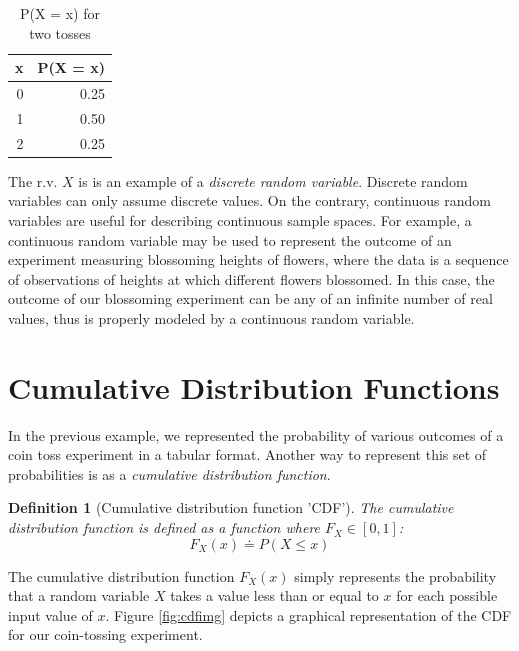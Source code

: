 \documentclass[
  12pt,
]{book}
\theoremstyle{definition}
\newtheorem{definition}{Definition}[chapter]
\theoremstyle{definition}
\theoremstyle{definition}
\theoremstyle{remark}
\begin{document}
\begin{table}[!h]

\caption{\label{tab:rv}P(X = x) for two tosses}
\centering
\begin{tabular}[t]{rr}
\toprule
x & P(X = x)\\
\midrule
0 & 0.25\\
1 & 0.50\\
2 & 0.25\\
\bottomrule
\end{tabular}
\end{table}

The r.v. \(X\) is is an example of a \emph{discrete random variable}.
Discrete random variables can only assume discrete values.
On the contrary, continuous random variables are useful for describing continuous sample spaces.
For example, a continuous random variable may be used to represent the outcome of an experiment measuring blossoming heights of flowers, where the data is a sequence of observations of heights at which different flowers blossomed.
In this case, the outcome of our blossoming experiment can be any of an infinite number of real values, thus is properly modeled by a continuous random variable.

\hypertarget{cumulative-distribution-functions}{%
\section{Cumulative Distribution Functions}\label{cumulative-distribution-functions}}

In the previous example, we represented the probability of various outcomes of a coin toss experiment in a tabular format.
Another way to represent this set of probabilities is as a \emph{cumulative distribution function}.

\begin{definition}[Cumulative distribution function 'CDF']
\protect\hypertarget{def:cdf}{}{\label{def:cdf} {} }\emph{The cumulative distribution function is defined as a function where \(F_{X}\in[0, 1]\):}
\[F_{X}(x) \doteq P(X≤x)\]
\end{definition}

The cumulative distribution function \(F_{X}(x)\) simply represents the probability that a random variable \(X\) takes a value less than or equal to \(x\) for each possible input value of \(x\).
Figure \ref{fig:cdfimg} depicts a graphical representation of the CDF for our coin-tossing experiment.
\end{document}
